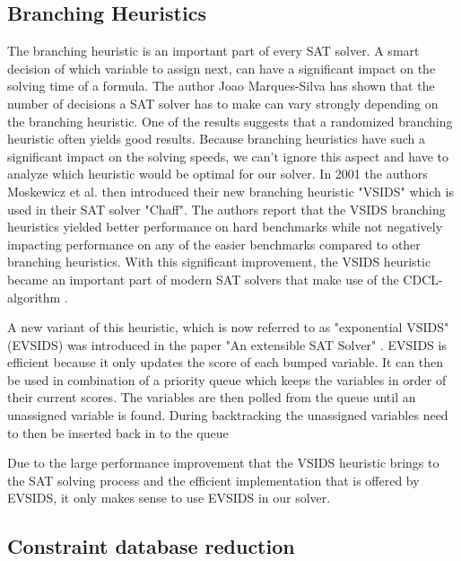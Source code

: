 \subsection{Branching Heuristics}

The branching heuristic is an important part of every SAT solver. A smart decision of which variable to assign next, can have a significant impact on the solving time of a formula. The author Joao Marques-Silva \cite{marques1999impact} has shown that the number of decisions a SAT solver has to make can vary strongly depending on the branching heuristic. One of the results suggests that a randomized branching heuristic often yields good results. Because branching heuristics have such a significant impact on the solving speeds, we can't ignore this aspect and have to analyze which heuristic would be optimal for our solver. In 2001 the authors Moskewicz et al. \cite{moskewicz2001chaff} then introduced their new branching heuristic "VSIDS" which is used in their SAT solver "Chaff". The authors report that the VSIDS branching heuristics yielded better performance on hard benchmarks while not negatively impacting performance on any of the easier benchmarks \cite{moskewicz2001chaff} compared to other branching heuristics. With this significant improvement, the VSIDS heuristic became an important part of modern SAT solvers that make use of the CDCL-algorithm \cite{biere2015evaluating}. 

A new variant of this heuristic, which is now referred to as "exponential VSIDS" (EVSIDS) \cite{biere2015evaluating} was introduced in the paper "An extensible SAT Solver" \cite{een2003extensible}. EVSIDS is efficient because it only updates the score of each bumped variable. It can then be used in combination of a priority queue which keeps the variables in order of their current scores. The variables are then polled from the queue until an unassigned variable is found. During backtracking the unassigned variables need to then be inserted back in to the queue \cite{biere2015evaluating}

Due to the large performance improvement that the VSIDS heuristic brings to the SAT solving process and the efficient implementation that is offered by EVSIDS, it only makes sense to use EVSIDS in our solver.

\subsection{Constraint database reduction}

